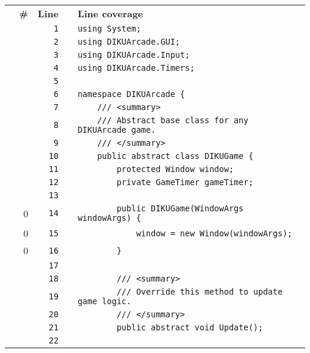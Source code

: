 \documentclass[a4paper,landscape,10pt]{article}
\begin{document}
\begin{longtable}[l]{lrrll}
\textbf{} & \textbf{\#} & \textbf{Line} & \textbf{} & \textbf{Line coverage}\\
\cellcolor{gray} &  & \verb~1~ & & \verb~using System;~\\
\cellcolor{gray} &  & \verb~2~ & & \verb~using DIKUArcade.GUI;~\\
\cellcolor{gray} &  & \verb~3~ & & \verb~using DIKUArcade.Input;~\\
\cellcolor{gray} &  & \verb~4~ & & \verb~using DIKUArcade.Timers;~\\
\cellcolor{gray} &  & \verb~5~ & & \verb~~\\
\cellcolor{gray} &  & \verb~6~ & & \verb~namespace DIKUArcade {~\\
\cellcolor{gray} &  & \verb~7~ & & \verb~    /// <summary>~\\
\cellcolor{gray} &  & \verb~8~ & & \verb~    /// Abstract base class for any DIKUArcade game.~\\
\cellcolor{gray} &  & \verb~9~ & & \verb~    /// </summary>~\\
\cellcolor{gray} &  & \verb~10~ & & \verb~    public abstract class DIKUGame {~\\
\cellcolor{gray} &  & \verb~11~ & & \verb~        protected Window window;~\\
\cellcolor{gray} &  & \verb~12~ & & \verb~        private GameTimer gameTimer;~\\
\cellcolor{gray} &  & \verb~13~ & & \verb~~\\
\cellcolor{red} & 0 & \verb~14~ & & \verb~        public DIKUGame(WindowArgs windowArgs) {~\\
\cellcolor{red} & 0 & \verb~15~ & & \verb~            window = new Window(windowArgs);~\\
\cellcolor{red} & 0 & \verb~16~ & & \verb~        }~\\
\cellcolor{gray} &  & \verb~17~ & & \verb~~\\
\cellcolor{gray} &  & \verb~18~ & & \verb~        /// <summary>~\\
\cellcolor{gray} &  & \verb~19~ & & \verb~        /// Override this method to update game logic.~\\
\cellcolor{gray} &  & \verb~20~ & & \verb~        /// </summary>~\\
\cellcolor{gray} &  & \verb~21~ & & \verb~        public abstract void Update();~\\
\cellcolor{gray} &  & \verb~22~ & & \verb~~\\

\end{longtable}
\end{document}
